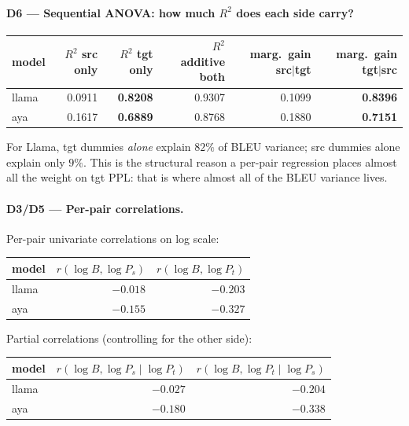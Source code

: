 \documentclass[11pt]{article}
\begin{document}
\paragraph{D6 --- Sequential ANOVA: how much $R^2$ does each side carry?}

\begin{center}
\small
\begin{tabular}{lrrrrr}
\toprule
model & $R^2$ src only & $R^2$ tgt only & $R^2$ additive both
      & marg.\ gain src$\mid$tgt & marg.\ gain tgt$\mid$src \\
\midrule
llama & 0.0911 & \textbf{0.8208} & 0.9307 & 0.1099 & \textbf{0.8396} \\
aya   & 0.1617 & \textbf{0.6889} & 0.8768 & 0.1880 & \textbf{0.7151} \\
\bottomrule
\end{tabular}
\end{center}

For Llama, tgt dummies \emph{alone} explain $82\%$ of BLEU variance; src
dummies alone explain only $9\%$. This is the structural reason a per-pair
regression places almost all the weight on tgt PPL: that is where almost
all of the BLEU variance lives.

\paragraph{D3/D5 --- Per-pair correlations.}

Per-pair univariate correlations on log scale:

\begin{center}
\small
\begin{tabular}{lrr}
\toprule
model & $r(\log B, \log P_s)$ & $r(\log B, \log P_t)$ \\
\midrule
llama & $-0.018$ & $-0.203$ \\
aya   & $-0.155$ & $-0.327$ \\
\bottomrule
\end{tabular}
\end{center}

Partial correlations (controlling for the other side):

\begin{center}
\small
\begin{tabular}{lrr}
\toprule
model & $r(\log B, \log P_s \mid \log P_t)$ & $r(\log B, \log P_t \mid \log P_s)$ \\
\midrule
llama & $-0.027$ & $-0.204$ \\
aya   & $-0.180$ & $-0.338$ \\
\bottomrule
\end{tabular}
\end{center}
\end{document}
